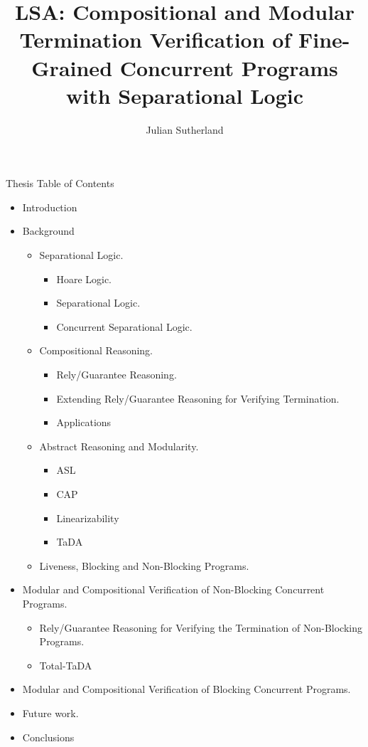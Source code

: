 \documentclass{article}
\title{LSA: Compositional and Modular Termination Verification of Fine-Grained Concurrent Programs with Separational Logic}
\author{Julian Sutherland}
\date{}
\begin{document}
\maketitle
\newpage 

\begin{section}{Thesis Table of Contents}

  \begin{itemize}
  \item Introduction
  \item Background
    \begin{itemize}
    \item Separational Logic.
      \begin{itemize}
      \item Hoare Logic.
      \item Separational Logic.
      \item Concurrent Separational Logic.
      \end{itemize}
    \item Compositional Reasoning.
      \begin{itemize}
      \item Rely/Guarantee Reasoning.
      \item Extending Rely/Guarantee Reasoning for Verifying Termination.
      \item Applications
      \end{itemize}
    \item Abstract Reasoning and Modularity.
      \begin{itemize}
      \item ASL
      \item CAP
      \item Linearizability
      \item TaDA
      \end{itemize}
    \item Liveness, Blocking and Non-Blocking Programs.
    \end{itemize}
  \item Modular and Compositional Verification of Non-Blocking Concurrent Programs.
    \begin{itemize}
    \item Rely/Guarantee Reasoning for Verifying the Termination of Non-Blocking Programs.
    \item Total-TaDA
    \end{itemize}
  \item Modular and Compositional Verification of Blocking Concurrent Programs.
  \item Future work.
  \item Conclusions
  \end{itemize}

\newpage
  
\end{section}
\end{document}
